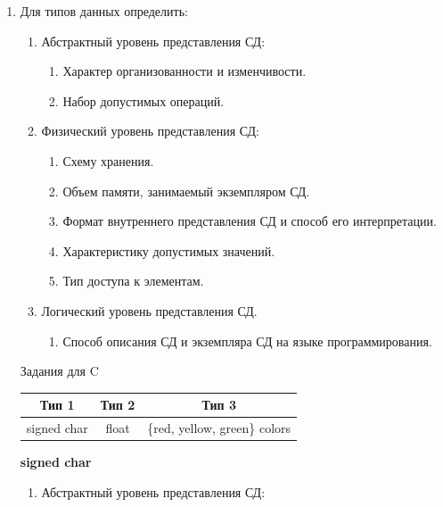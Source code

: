 \documentclass[a4paper,14pt]{extarticle}
\begin{document}
\begin{enumerate}
	\item Для типов данных определить:
	      \begin{enumerate}[label*=\arabic*.]
		      \item Абстрактный уровень представления СД:

		            \begin{enumerate}[label*=\arabic*.]
			            \item Характер организованности и изменчивости.
			            \item Набор допустимых операций.
		            \end{enumerate}

		      \item Физический уровень представления СД:

		            \begin{enumerate}[label*=\arabic*.]
			            \item Схему хранения.
			            \item Объем памяти, занимаемый экземпляром СД.
			            \item Формат внутреннего представления СД и способ его интерпретации.
			            \item Характеристику допустимых значений.
			            \item Тип доступа к элементам.
		            \end{enumerate}

		      \item Логический уровень представления СД.
		            \begin{enumerate}[label*=\arabic*.]
			            \item Способ описания СД и экземпляра СД на языке программирования.
		            \end{enumerate}
	      \end{enumerate}

	      \begin{center}Задания для C\\
		      \begin{tabular}{|c|c|c|}
			      \hline
			      Тип 1       & Тип 2 & Тип 3                         \\
			      \hline
			      signed char & float & \{red, yellow, green\} colors \\
			      \hline
		      \end{tabular}
	      \end{center}
	      \textbf{signed char}
	      \begin{enumerate}[label*=\arabic*.]
		      \item Абстрактный уровень представления СД:


\end{enumerate}
\end{enumerate}
\end{document}
